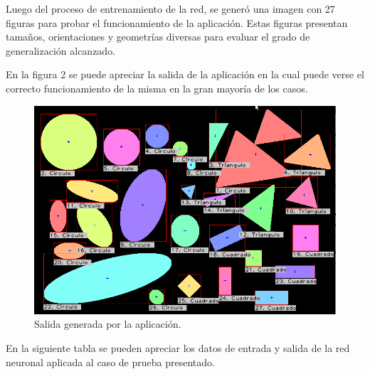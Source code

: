 \documentclass[pdftex,a4paper,12pt]{article}
\begin{document}
Luego del proceso de entrenamiento de la red, se gener\'o una imagen con 27 figuras para probar el funcionamiento de la aplicaci\'on. Estas figuras presentan tama\~nos, orientaciones y geometr\'ias diversas para evaluar el grado de generalizaci\'on alcanzado.

En la figura 2 se puede apreciar la salida de la aplicaci\'on en la cual puede verse el correcto funcionamiento de la misma en la gran mayor\'ia de los casos.

               \begin{figure}[H]
	                  \begin{center}
	                    \includegraphics[width=17cm]{salida.png}
	                    \caption{\label{image_soleil} Salida generada por la aplicaci\'on. }
	                  \end{center}
	            \end{figure}

En la siguiente tabla se pueden apreciar los datos de entrada y salida de la red neuronal aplicada al caso de prueba presentado.
\end{document}
